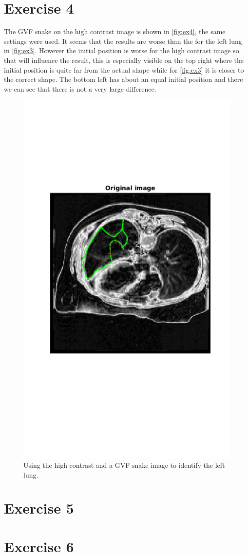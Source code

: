\documentclass[a4paper]{article}
\begin{document}
\section*{Exercise 4}
The GVF snake on the high contrast image is shown in \autoref{fig:ex4}, the same settings were used. It seems that the results are worse than the for the left lung in \autoref{fig:ex3}. However the initial position is worse for the high contrast image so that will influence the result, this is especially visible on the top right where the initial position is quite far from the actual shape while for \autoref{fig:ex3} it is closer to the correct shape. The bottom left has about an equal initial position and there we can see that there is not a very large difference.

\begin{figure}
	\centering
	\includegraphics[width=.75\textwidth]{ex4}
	\caption{Using the high contrast and a GVF snake image to identify the left lung.}
	\label{fig:ex4}
\end{figure}
\section*{Exercise 5}
\section*{Exercise 6}
\end{document}
